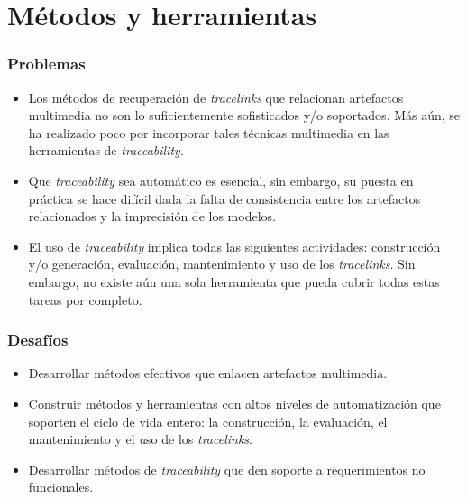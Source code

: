 \documentclass[a4paper,12pt,oneside,spanish]{book}
\begin{document}
\section{Métodos y herramientas}

\subsubsection{Problemas}

\begin{itemize}[label={$\times$}]

\item Los métodos de recuperación de \textit{tracelinks} que relacionan artefactos multimedia no son lo suficientemente sofisticados y/o soportados. Más aún, se ha realizado poco por incorporar tales técnicas multimedia en las herramientas de \textit{traceability}.

\item Que \textit{traceability} sea automático es esencial, sin embargo, su puesta en práctica se hace difícil dada la falta de consistencia entre los artefactos relacionados y la imprecisión de los modelos.

\item El uso de \textit{traceability} implica todas las siguientes actividades: construcción y/o generación, evaluación, mantenimiento y uso de los \textit{tracelinks}. Sin embargo, no existe aún una sola herramienta que pueda cubrir todas estas tareas por completo.

\end{itemize}

\subsubsection{Desafíos}

\begin{itemize}[label={\checkmark}]

\item Desarrollar métodos efectivos que enlacen artefactos multimedia.

\item Construir métodos y herramientas con altos niveles de automatización que soporten el ciclo de vida entero: la construcción, la evaluación, el mantenimiento y el uso de los \textit{tracelinks}.

\item Desarrollar métodos de \textit{traceability} que den soporte a requerimientos no funcionales.

\end{itemize}
\end{document}
